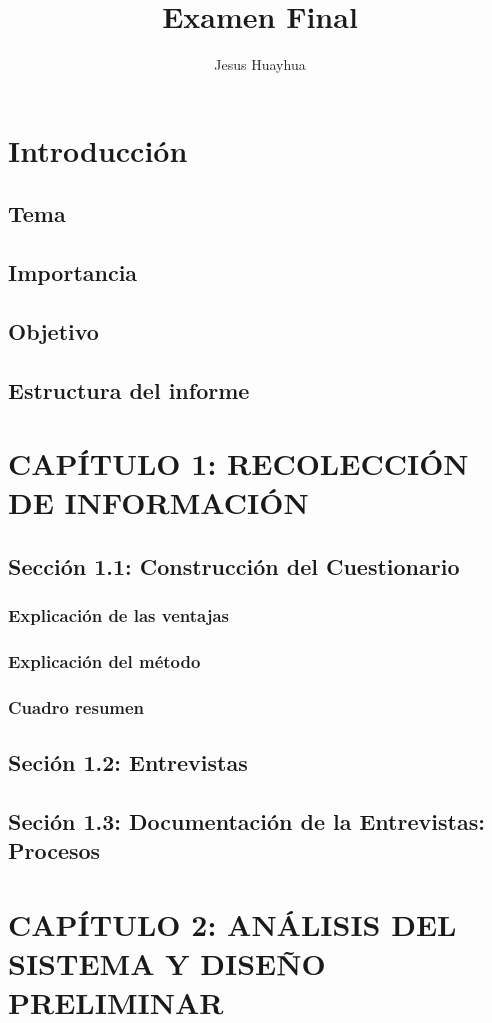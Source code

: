 \documentclass[a4paper]{article}
\title{Examen Final}
\author{Jesus Huayhua}
\begin{document}
  
	\newpage
  \tableofcontents
  \newpage
  \section{Introducción}
  \subsection{Tema}
  \subsection{Importancia}
  \subsection{Objetivo}
  \subsection{Estructura del informe}
  \section{CAPÍTULO 1: RECOLECCIÓN DE INFORMACIÓN}
  \subsection{Sección 1.1: Construcción del Cuestionario}
  \subsubsection{Explicación de las ventajas}
  \subsubsection{Explicación del método}
  \subsubsection{Cuadro resumen}
  \subsection{Seción 1.2: Entrevistas}
  \subsection{Seción 1.3: Documentación de la Entrevistas: Procesos}
  \section{ CAPÍTULO 2: ANÁLISIS DEL SISTEMA Y DISEÑO PRELIMINAR}
  
\end{document}
